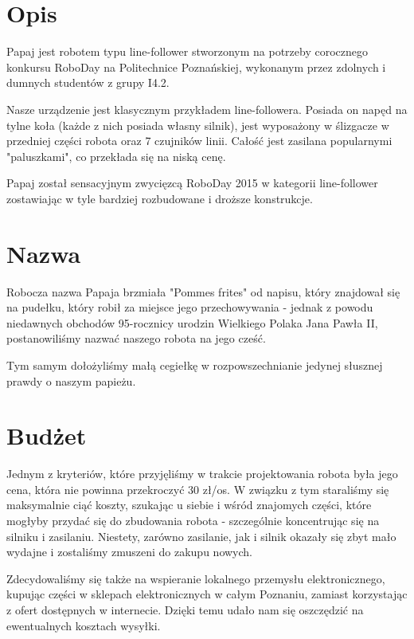 \documentclass{article}
\begin{document}

\tableofcontents
\newpage

\section{Opis}

Papaj jest robotem typu line-follower stworzonym na potrzeby corocznego konkursu RoboDay na Politechnice Poznańskiej, wykonanym przez zdolnych i dumnych studentów z grupy I4.2. 

Nasze urządzenie jest klasycznym przykładem line-followera. Posiada on napęd na tylne koła (każde z nich posiada własny silnik), jest wyposażony w ślizgacze w przedniej części robota oraz 7 czujników linii. Całość jest zasilana popularnymi "paluszkami", co przekłada się na niską cenę.

Papaj został sensacyjnym zwycięzcą RoboDay 2015 w kategorii line-follower zostawiając w tyle bardziej rozbudowane i droższe konstrukcje.

\section{Nazwa}
				
Robocza nazwa Papaja brzmiała "Pommes frites" od napisu, który znajdował się na pudełku, który robił za miejsce jego przechowywania - jednak z powodu niedawnych obchodów 95-rocznicy urodzin Wielkiego Polaka Jana Pawła II, postanowiliśmy nazwać naszego robota na jego cześć. 

Tym samym dołożyliśmy małą cegiełkę w rozpowszechnianie jedynej słusznej prawdy o naszym papieżu. 
						
\section{Budżet}

Jednym z kryteriów, które przyjęliśmy w trakcie projektowania robota była jego cena, która nie powinna przekroczyć 30 zł/os. W związku z tym staraliśmy się maksymalnie ciąć koszty, szukając u siebie i wśród znajomych części, które mogłyby przydać się do zbudowania robota - szczególnie koncentrując się na silniku i zasilaniu. Niestety, zarówno zasilanie, jak i silnik okazały się zbyt mało wydajne i zostaliśmy zmuszeni do zakupu nowych.

Zdecydowaliśmy się także na wspieranie lokalnego przemysłu elektronicznego, kupując części w sklepach elektronicznych w całym Poznaniu, zamiast korzystając z ofert dostępnych w internecie. Dzięki temu udało nam się oszczędzić na ewentualnych kosztach wysyłki.
\end{document}
